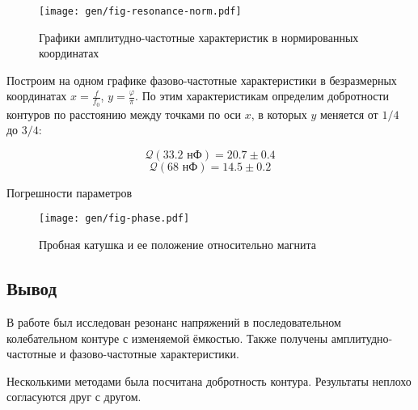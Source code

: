 \documentclass[12pt,a4paper]{article}
\begin{document}
\begin{figure}[H]
	\centering
	\texttt{[image: gen/fig-resonance-norm.pdf]}
	\caption{Графики амплитудно-частотные характеристик в нормированных координатах}
	\label{fig:norm}
\end{figure}


Построим на одном графике фазово-частотные характеристики в безразмерных координатах $x = \frac{f}{f_0}$, $y = \frac{\varphi}{\pi}$. По этим характеристикам определим добротности контуров по расстоянию между точками по оси $x$, в которых $y$ меняется от $1/4$ до $3/4$:

$$\mathcal{Q}\left(33.2 \text{ нФ}\right) = 20.7 \pm 0.4$$
$$\mathcal{Q}\left(68 \text{ нФ}\right) = 14.5 \pm 0.2$$


\begin{table}[H]
	\footnotesize
	\caption{Погрешности параметров}
	
	\label{tab:norm}
\end{table}



\begin{figure}[H]
	\centering
	\texttt{[image: gen/fig-phase.pdf]}
	\caption{Пробная катушка и ее положение относительно магнита}
\end{figure}

\subsection*{Вывод}
В работе был исследован резонанс напряжений в последовательном колебательном контуре с изменяемой ёмкостью. Также получены амплитудно-частотные и фазово-частотные характеристики.

Несколькими методами была посчитана добротность контура. Результаты неплохо согласуются друг с другом.
\end{document}
